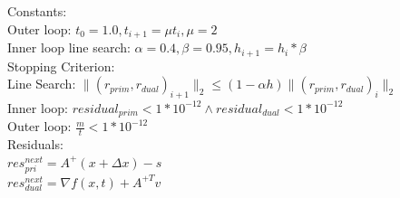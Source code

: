 \documentclass[12pt,letter]{article}
\begin{document}
\begin{enumerate}
\begin{itemize}
    Constants:\\
    Outer loop: $t_0 = 1.0, t_{i+1} = \mu t_i, \mu = 2$\\
    Inner loop line search: $\alpha = 0.4, \beta =0.95, h_{i+1} = h_i * \beta$\\
    
    Stopping Criterion:\\
    Line Search: $\|(r_{prim},r_{dual})_{i+1}\|_2 \leq (1-\alpha h)\|(r_{prim},r_{dual})_i\|_2$\\
    Inner loop: $residual_{prim} < 1*10^{-12} \wedge residual_{dual} < 1*10^{-12}$\\
    Outer loop: $\frac{m}{t} < 1*10^{-12}$\\
    
    Residuals:\\
    $res_{pri}^{next} = A^{+}(x+\Delta x)-s$\\
    $res_{dual}^{next} = \nabla f(x,t) + A^{+T} v$\\


\end{itemize}
\end{enumerate}
\end{document}
